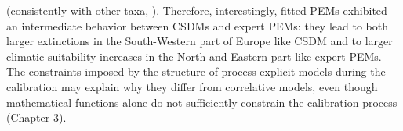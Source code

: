 \documentclass[letterpaper,8pt]{extarticle}  %
\begin{document}
\begin{doublespacing}
\begin{linenumbers}
(consistently with other taxa, \citealp{Buckley2010}). Therefore, interestingly, fitted PEMs exhibited an intermediate behavior between CSDMs and expert PEMs: they lead to both larger extinctions in the South-Western part of Europe like CSDM and to larger climatic suitability increases in the North and Eastern part like expert PEMs. The constraints imposed by the structure of process-explicit models during the calibration may explain why they differ from correlative models, even though mathematical functions alone do not suﬀiciently constrain the calibration process (Chapter 3).

\end{linenumbers}
\end{doublespacing}
\end{document}
